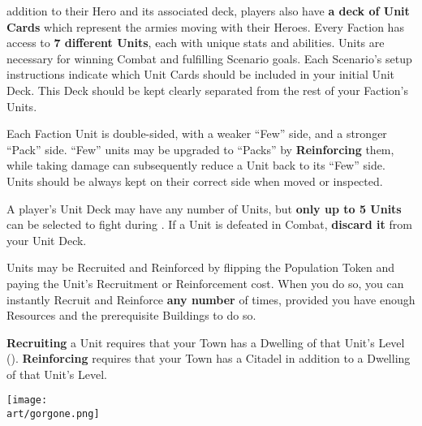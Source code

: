 
\begin{multicols*}{2}

 addition to their Hero and its associated deck, players also have \textbf{a deck of Unit Cards} which represent the armies moving with their Heroes.
Every Faction has access to \textbf{7 different Units}, each with unique stats and abilities.
Units are necessary for winning Combat and fulfilling Scenario goals.
Each Scenario's setup instructions indicate which Unit Cards should be included in your initial Unit Deck.
This Deck should be kept clearly separated from the rest of your Faction's Units.\par
Each Faction Unit is double-sided, with a weaker ``Few'' side, and a stronger ``Pack'' side.
``Few'' units may be upgraded to ``Packs'' by \textbf{Reinforcing} them, while taking damage can subsequently reduce a Unit back to its ``Few'' side.
Units should be always kept on their correct side when moved or inspected.\par
A player's Unit Deck may have any number of Units, but \textbf{only up to 5 Units} can be selected to fight during .
If a Unit is defeated in Combat, \textbf{discard it} from your Unit Deck.\par
Units may be Recruited and Reinforced by flipping the Population Token and paying the Unit's Recruitment  or Reinforcement  cost.
When you do so, you can instantly Recruit and Reinforce \textbf{any number} of times, provided you have enough Resources and the prerequisite Buildings to do so.\par
\textbf{Recruiting} a Unit requires that your Town has a Dwelling of that Unit's Level ().
\textbf{Reinforcing} requires that your Town has a Citadel in addition to a Dwelling of that Unit's Level.\par


\vspace*{\fill}
  \iftoggle{printable}{}{\hspace{1em}}
\texttt{[image: \\art/gorgone.png]}

\clearpage

\end{multicols*}
